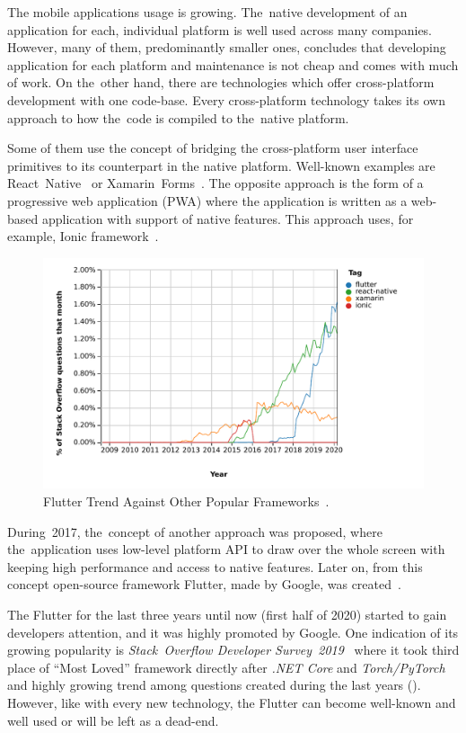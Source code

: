 \begin{introduction}
The mobile applications usage is growing. The~native development of an application for each, individual platform is well used across many companies. However, many of them, predominantly smaller ones, concludes that developing application for each platform and maintenance is not cheap and comes with much of work. On the~other hand, there are technologies which offer cross-platform development with one code-base. Every cross-platform technology takes its own approach to how the~code is compiled to the~native platform. 

Some of them use the concept of bridging the cross-platform user interface primitives to its counterpart in the native platform. Well-known examples are React~Native~\cite{react-native} or Xamarin~Forms~\cite{xamarin-forms}. The opposite approach is the form of a progressive web application (PWA) where the application is written as a web-based application with support of native features. This approach uses, for example, Ionic framework~\cite{ionic}. 

\begin{figure}[htp]
    \centering
    \includegraphics[width=0.9\linewidth]{img/introduction/so-flutter-trend.pdf}
    \caption{Flutter Trend Against Other Popular Frameworks~\cite{so-flutter-trend}.}
    \label{fig:so-flutter-trend}
\end{figure}

During~2017, the~concept of another approach was proposed, where the~application uses low-level platform API to draw over the whole screen with keeping high performance and access to native features. Later on, from this concept open-source framework Flutter, made by Google,  was created~\cite{flutter}. 

The Flutter for the last three years until now (first half of 2020) started to gain developers attention, and it was highly promoted by Google. One indication of its growing popularity is \textit{Stack~Overflow Developer Survey~2019}~\cite{so-2019-survey} where it took third place of ``Most Loved'' framework directly after \textit{.NET Core} and \textit{Torch/PyTorch} and highly growing trend among questions created during the last years (). However, like with every new technology, the Flutter can become well-known and well used or will be left as a dead-end. 


\end{introduction}
